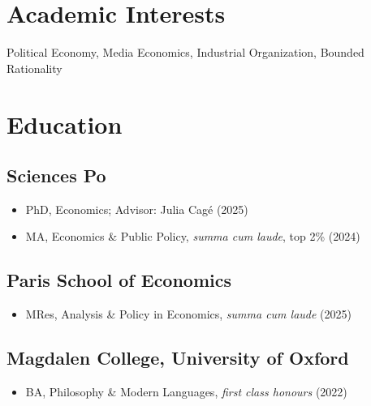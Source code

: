 \documentclass{cv_style}
\begin{document}

    \begin{center}  

    
	\end{center}
	
	\section{Academic Interests}
	Political Economy, Media Economics, Industrial Organization, Bounded Rationality

	\section{Education}
		\subsection{Sciences Po}
				\begin{itemize}
					\item PhD, Economics; Advisor: Julia Cagé (2025\textendash)
					\item MA, Economics \& Public Policy, \textit{summa cum laude}, top 2\% (2024)
				\end{itemize}
                
		\subsection{Paris School of Economics}
				\begin{itemize}
					\item MRes, Analysis \& Policy in Economics, \textit{summa cum laude} (2025)
				\end{itemize}
				
		\subsection{Magdalen College, University of Oxford}
				\begin{itemize}
					\item BA, Philosophy \& Modern Languages, \textit{first class honours} (2022)
				\end{itemize}
		
\end{document}
